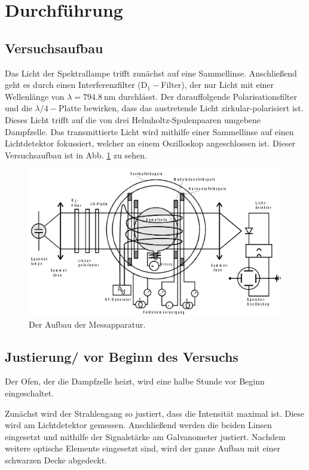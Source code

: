 \section{Durchführung}
\label{sec:Durchführung}

\subsection{Versuchsaufbau}
Das Licht der Spektrallampe trifft zunächst auf eine Sammellinse. Anschließend geht es durch einen Interferenzfilter (D$_1-$Filter), der nur Licht mit einer Wellenlänge von $\lambda = \SI{794.8}{\nano\meter}$ durchlässt. Der darauffolgende Polarisationsfilter und die $\lambda / 4-$Platte bewirken, dass das austretende Licht zirkular-polarisiert ist. Dieses Licht trifft auf die von drei Helmholtz-Spulenpaaren umgebene Dampfzelle. Das transmittierte Licht wird mithilfe einer Sammellinse auf einen Lichtdetektor fokussiert, welcher an einem Oszilloskop angeschlossen ist. \cite{V21}
Dieser Versuchsaufbau ist in Abb. \ref{fig:aufbau} zu sehen.

\begin{figure}
    \centering
    \includegraphics[width=15cm]{fotos/aufbau.png}
    \caption{Der Aufbau der Messapparatur. \cite{V21}}
    \label{fig:aufbau}
\end{figure}

\subsection{Justierung/ vor Beginn des Versuchs}
Der Ofen, der die Dampfzelle heizt, wird eine halbe Stunde vor Beginn eingeschaltet. \cite{V21}

Zunächst wird der Strahlengang so justiert, dass die Intensität maximal ist. Diese wird am Lichtdetektor gemessen.
Anschließend werden die beiden Linsen eingesetzt und mithilfe der Signalstärke am Galvanometer justiert.
Nachdem weitere optische Elemente eingesetzt sind, wird der ganze Aufbau mit einer schwarzen Decke abgedeckt. \cite{V21}

